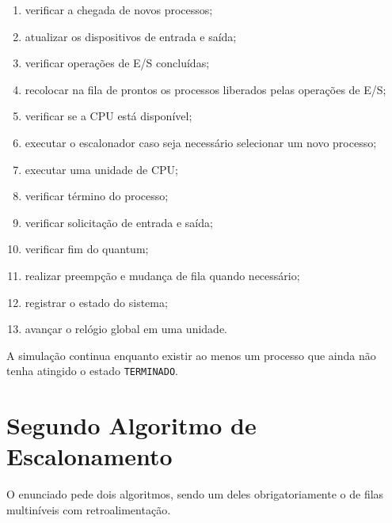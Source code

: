 \documentclass[12pt,a4paper]{article}
\begin{document}
\begin{enumerate}

    \item verificar a chegada de novos processos;

    \item atualizar os dispositivos de entrada e saída;

    \item verificar operações de E/S concluídas;

    \item recolocar na fila de prontos os processos liberados pelas
    operações de E/S;

    \item verificar se a CPU está disponível;

    \item executar o escalonador caso seja necessário selecionar um
    novo processo;

    \item executar uma unidade de CPU;

    \item verificar término do processo;

    \item verificar solicitação de entrada e saída;

    \item verificar fim do quantum;

    \item realizar preempção e mudança de fila quando necessário;

    \item registrar o estado do sistema;

    \item avançar o relógio global em uma unidade.

\end{enumerate}

A simulação continua enquanto existir ao menos um processo que ainda
não tenha atingido o estado \texttt{TERMINADO}.



\section{Segundo Algoritmo de Escalonamento}
\label{sec:segundo}

O enunciado pede dois algoritmos, sendo um deles obrigatoriamente o
de filas multiníveis com retroalimentação.
\end{document}
